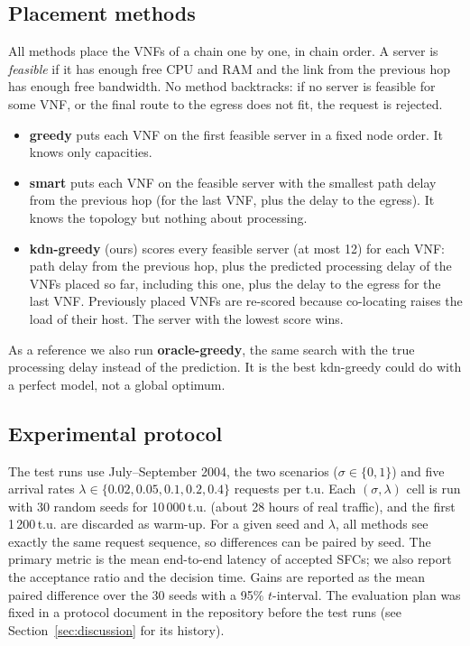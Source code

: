 \documentclass[conference,a4paper]{IEEEtran}
\begin{document}
\subsection{Placement methods}
All methods place the VNFs of a chain one by one, in chain order. A server is \emph{feasible} if it has enough free
CPU and RAM and the link from the previous hop has enough free bandwidth. No method backtracks: if no server is
feasible for some VNF, or the final route to the egress does not fit, the request is rejected.
\begin{itemize}
\item \textbf{greedy} puts each VNF on the first feasible server in a fixed node order. It knows only capacities.
\item \textbf{smart} puts each VNF on the feasible server with the smallest path delay from the previous hop (for
the last VNF, plus the delay to the egress). It knows the topology but nothing about processing.
\item \textbf{kdn-greedy} (ours) scores every feasible server (at most 12) for each VNF: path delay from the
previous hop, plus the predicted processing delay of the VNFs placed so far, including this one, plus the delay to
the egress for the last VNF. Previously placed VNFs are re-scored because co-locating raises the load of their
host. The server with the lowest score wins.
\end{itemize}
As a reference we also run \textbf{oracle-greedy}, the same search with the true processing delay instead of the
prediction. It is the best kdn-greedy could do with a perfect model, not a global optimum.

\subsection{Experimental protocol}
The test runs use July--September 2004, the two scenarios ($\sigma \in \{0, 1\}$) and five arrival rates
$\lambda \in \{0.02, 0.05, 0.1, 0.2, 0.4\}$ requests per t.u. Each $(\sigma, \lambda)$ cell is run with 30 random
seeds for 10\,000\,t.u. (about 28 hours of real traffic), and the first 1\,200\,t.u. are discarded as warm-up. For a
given seed and $\lambda$, all methods see exactly the same request sequence, so differences can be paired by seed.
The primary metric is the mean end-to-end latency of accepted SFCs; we also report the acceptance ratio and the
decision time. Gains are reported as the mean paired difference over the 30 seeds with a 95\% $t$-interval. The
evaluation plan was fixed in a protocol document in the repository before the test runs (see
Section~\ref{sec:discussion} for its history).
\end{document}
